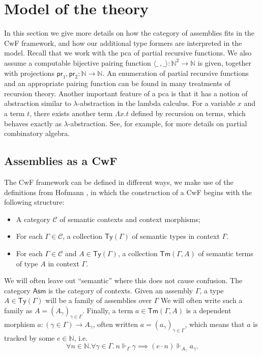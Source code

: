 \documentclass[10pt,a4paper]{article}
\theoremstyle{definition}
\theoremstyle{remark}
\renewcommand{\.}{.\,} %
\renewcommand{\:}{:} %
\newcommand{\bN}{\mathbb{N}}
\newcommand{\C}{\mathcal C}
\newcommand{\0}{\mathbf{0}}
\newcommand{\1}{\mathbf{1}}
\newcommand\<\langle
\renewcommand\>\rangle
\newcommand{\Asm}{\mathsf{Asm}}
\newcommand{\pr}{\mathsf{pr}}
\newcommand{\Ty}{\mathsf{Ty}}
\newcommand{\Tm}{\mathsf{Tm}}
\theoremstyle{remark}
\begin{document}
\section{Model of the theory}
\label{appendix:model}
In this section we give more details on how the category of assemblies fits in the CwF framework, and how our additional type formers are interpreted in the model. Recall that we work with the pca of partial recursive functions. We also assume a computable bijective pairing function $\langle \_\, , \_ \rangle : \bN^2 \to \bN$ is given, together with projections $\pr_1, \pr_2 : \bN \to \bN$. An enumeration of partial recursive functions and an appropriate pairing function can be found in many treatments of recursion theory. Another important feature of a pca is that it has a notion of abstraction similar to $\lambda$-abstraction in the lambda calculus. For a variable $x$ and a term $t$, there exists another term $\Lambda x . t$ defined by recursion on terms, which behaves exactly as $\lambda$-abstraction. See, for example, \cite{oosten} for more details on partial combinatory algebra.

\subsection{Assemblies as a CwF}
 The CwF framework can be defined in different ways, we make use of the definitions from Hofmann \cite{Hofmann_1997}, in which the construction of a CwF begins with the following structure:
\begin{itemize}
	\item A category $\C$ of semantic contexts and context morphisms;
	\item For each $\Gamma \in \C$, a collection $\Ty(\Gamma)$ of semantic types in context $\Gamma$.
	\item For each $\Gamma \in \C$ and $A \in \Ty(\Gamma)$, a collection $\Tm(\Gamma, A)$ of semantic terms of type $A$ in context $\Gamma$.
\end{itemize}
We will often leave out ``semantic'' where this does not cause confusion. The category $\Asm$ is the category of contexts. Given an assembly $\Gamma$, a type $A \in \Ty(\Gamma)$ will be a family of assemblies over $\Gamma$ We will often write such a family as $A = (A_\gamma)_{\gamma \in \Gamma}$. Finally, a term $a \in \Tm(\Gamma, A)$ is a dependent morphism $a : (\gamma \in \Gamma) \to A_\gamma$, often written $a = (a_\gamma)_{\gamma \in \Gamma}$, which means that $a$ is tracked by some $e \in \bN$, i.e.
\[
\forall n \in \bN . \forall \gamma \in \Gamma \. n \Vdash_\Gamma \gamma \implies (e \cdot n) \Vdash_{A_\gamma} a_\gamma.
\]
\end{document}
